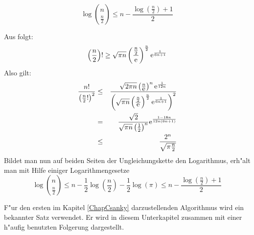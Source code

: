 \begin{lemma}
\label{SatzStirlingAnwendung}
    \[ \log{ n \choose \frac{n}{2} }
           \leq
       n - \frac{\log \left( \frac{n}{2} \right) + 1}{2}
    \]
\end{lemma}
\begin{beweis}
    Aus  folgt:
    \[ \left( \frac{n}{2} \right) !
           \geq
       \sqrt{\pi n}
       \left( \frac{ \frac{n}{2} }{\mbox{\rm e}} \right)^{\frac{n}{2}}
       \mbox{\rm e}^{\frac{1}{6n+1}}
    \]
    Also gilt:
    \begin{eqnarray}
    \label{EquStirling1Schaetzung}
       \frac{n!}{\left( \frac{n}{2}! \right)^2 }
           & \leq &
       \frac{
            \sqrt{2\pi n}
            \left( \frac{n}{\mbox{\rm e}} \right)^n
            \mbox{\rm e}^{\frac{1}{12n}}
       }{
            \left(
                \sqrt{\pi n}
                \left( \frac{ \frac{n}{2} }{\mbox{\rm e}} \right)^{\frac{n}{2}}
                \mbox{\rm e}^{\frac{1}{6n+1}}
            \right)^2
       }
    \\ \label{EquStirling2Schaetzung}
           & = &
       \frac{
           \sqrt{2}
       }{
           \sqrt{\pi n} \left( \frac{1}{2} \right)^n
       }
       \mbox{\rm e}^{ \frac{ 1-18n }{ 12n(6n+1) } }
    \\ \nonumber
        & \leq & \frac{2^n}{ \sqrt{ \pi \frac{n}{2} }  }
    \end{eqnarray}
    Bildet man nun auf beiden Seiten der Ungleichungskette den
    Logarithmus, erh"alt man mit Hilfe einiger Logarithmengesetze
    \[ \log{ n \choose \frac{n}{2} }
           \leq
       n - \frac{1}{2} \log\left( \frac{n}{2} \right) -
                                                   \frac{1}{2} \log(\pi)
           \leq
       n - \frac{ \log \left( \frac{n}{2} \right) + 1 }{2}
    \]
\end{beweis}


\label{SecLaplace}

F"ur den ersten im Kapitel \ref{ChapCsanky} darzustellenden Algorithmus
wird ein bekannter Satz verwendet. Er wird in diesem Unterkapitel zusammen 
mit einer h"aufig benutzten Folgerung dargestellt.

